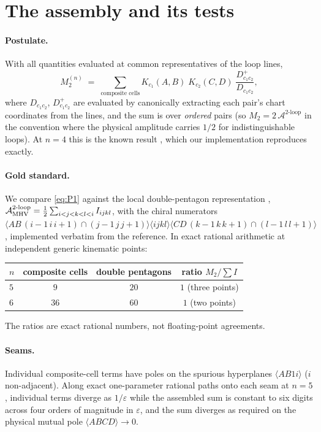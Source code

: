 \documentclass[11pt]{article}
\newcommand{\br}[1]{\langle #1 \rangle}
\begin{document}
\section{The assembly and its tests}

\paragraph{Postulate.} With all quantities evaluated at common
representatives of the loop lines,
\begin{equation}
\label{eq:P1}
M_2^{(n)} \;=\; \sum_{\text{composite cells}}
K_{c_1}(A,B)\; K_{c_2}(C,D)\; \frac{D^{+}_{c_1c_2}}{D_{c_1c_2}},
\end{equation}
where $D_{c_1c_2}$, $D^{+}_{c_1c_2}$ are evaluated by canonically
extracting each pair's chart coordinates from the lines, and the sum is
over \emph{ordered} pairs (so $M_2 = 2\,\mathcal{A}^{2\text{-loop}}$ in
the convention where the physical amplitude carries $1/2$ for
indistinguishable loops). At $n=4$ this is the known result
\citep{Kojima:2020gxs}, which our implementation reproduces exactly.

\paragraph{Gold standard.} We compare \eqref{eq:P1} against the local
double-pentagon representation \citep{ArkaniHamed:2010gh},
$\mathcal{A}^{2\text{-loop}}_{\rm MHV} = \tfrac12\sum_{i<j<k<l<i} I_{ijkl}$,
with the chiral numerators
$\br{AB\,(i{-}1\,i\,i{+}1)\cap(j{-}1\,j\,j{+}1)}\br{ijkl}
\br{CD\,(k{-}1\,k\,k{+}1)\cap(l{-}1\,l\,l{+}1)}$, implemented verbatim
from the reference. In exact rational arithmetic at independent generic
kinematic points:

\begin{center}
\begin{tabular}{lccc}
\toprule
$n$ & composite cells & double pentagons & ratio
$M_2 / \sum I$ \\
\midrule
$5$ & $9$  & $20$ & $1$ (three points) \\
$6$ & $36$ & $60$ & $1$ (two points) \\
\bottomrule
\end{tabular}
\end{center}

The ratios are exact rational numbers, not floating-point agreements.

\paragraph{Seams.} Individual composite-cell terms have poles on the
spurious hyperplanes $\br{AB1i}$ ($i$ non-adjacent). Along exact
one-parameter rational paths onto each seam at $n=5$, individual terms
diverge as $1/\varepsilon$ while the assembled sum is constant to six
digits across four orders of magnitude in $\varepsilon$, and the sum
diverges as required on the physical mutual pole $\br{ABCD}\to 0$.
\end{document}
